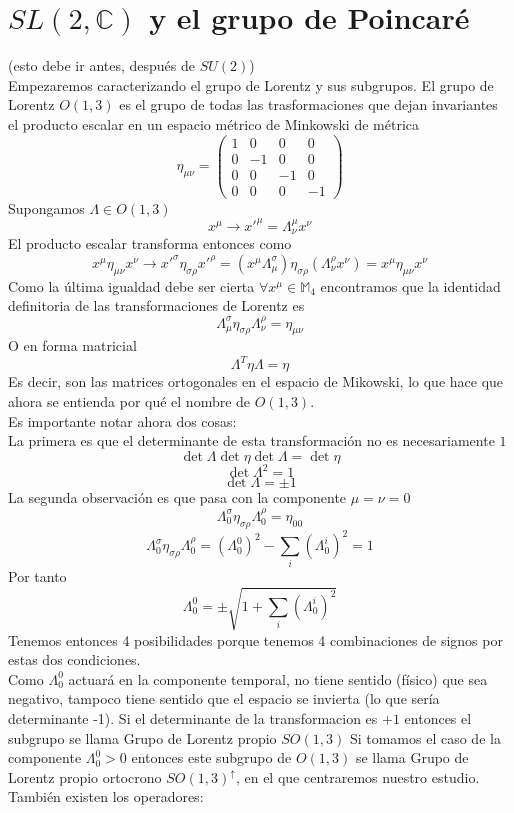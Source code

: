 \documentclass[12pt]{article}
\begin{document}
\section{$SL(2,\mathbb{C})$ y el grupo de Poincaré}
(esto debe ir antes, después de $SU(2)$) \\
Empezaremos caracterizando el grupo de Lorentz y sus subgrupos. El grupo de Lorentz $O(1,3)$ es el grupo de todas las trasformaciones que dejan invariantes el producto escalar en un espacio métrico de Minkowski de métrica
$$\eta_{\mu \nu}=\begin{pmatrix}
	1 & 0 & 0 &0 \\ 0 &-1 &0 &0 \\ 0 & 0 & -1 & 0 \\ 0 & 0 & 0& -1
\end{pmatrix}$$
Supongamos $\Lambda \in O(1,3)$
$$x^\mu\rightarrow x'^\mu=\Lambda^\mu_\nu x^\nu$$ 
El producto escalar transforma entonces como
$$x^\mu\eta_{\mu \nu}x^\nu\rightarrow x'^\sigma\eta_{\sigma \rho}x'^\rho=(x^\mu\Lambda^\sigma_\mu)\eta_{\sigma \rho}(\Lambda^\rho_\nu x^\nu)=x^\mu\eta_{\mu \nu}x^\nu$$
Como la última igualdad debe ser cierta $\forall x^\mu \in \mathbb{M}_4$ encontramos que la identidad definitoria de las transformaciones de Lorentz es
$$\Lambda^\sigma_\mu\eta_{\sigma \rho}\Lambda^\rho_\nu=\eta_{\mu \nu}$$
O en forma matricial
$$\Lambda^T\eta\Lambda=\eta$$
Es decir, son las matrices ortogonales en el espacio de Mikowski, lo que hace que ahora se entienda por qué el nombre de $O(1,3)$.\\
Es importante notar ahora dos cosas:\\
La primera es que el determinante de esta transformación no es necesariamente $1$
$$\det\Lambda\det\eta\det\Lambda=\det\eta$$
$$\det\Lambda^2=1$$
$$\det\Lambda=\pm 1$$
La segunda observación es que pasa con la componente $\mu=\nu=0$
$$\Lambda^\sigma_0\eta_{\sigma \rho}\Lambda^\rho_0=\eta_{00}$$
$$\Lambda^\sigma_0\eta_{\sigma \rho}\Lambda^\rho_0=(\Lambda^0_0)^2-\sum_{i}(\Lambda^i_0)^2=1$$
Por tanto
$$\Lambda^0_0=\pm\sqrt{1+\sum_{i}(\Lambda^i_0)^2}$$
Tenemos entonces 4 posibilidades porque tenemos 4 combinaciones de signos por estas dos condiciones. \\
Como $\Lambda^0_0$ actuará en la componente temporal, no tiene sentido (físico) que sea negativo, tampoco tiene sentido que el espacio se invierta (lo que sería determinante -1). Si el determinante de la transformacion es $+1$ entonces el subgrupo se llama Grupo de Lorentz propio $SO(1,3)$ Si tomamos el caso de la componente $\Lambda^0_0>0$ entonces este subgrupo de $O(1,3)$ se llama Grupo de Lorentz propio ortocrono $SO(1,3)^\uparrow$, en el que centraremos nuestro estudio. También existen los operadores:
\end{document}
